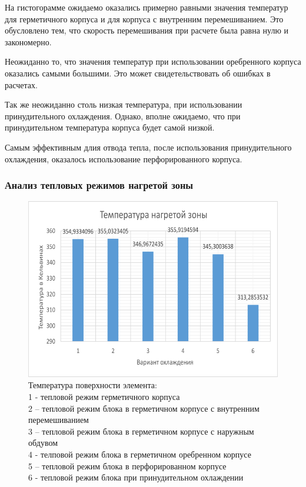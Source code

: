 На гистогорамме ожидаемо оказались примерно равными значения
температур для герметичного корпуса и для корпуса с внутренним
перемешиванием. Это обусловлено тем, что скорость перемешивания при
расчете была равна нулю и закономерно.


Неожиданно то, что значения температур при использовании
оребренного корпуса оказались самыми большими.
Это может свидетельствовать об ошибках в расчетах.

Так же неожиданно столь низкая температура,
при использовании принудительного охлаждения.
Однако, вполне ожидаемо, что при принудительном
температура корпуса будет самой низкой.

Самым эффективным длия отвода тепла, после использования
принудительного охлаждения, оказалось использование перфорированного
корпуса.

\subsubsection{Анализ тепловых режимов нагретой зоны}
\begin{figure}[h]
  \begin{center}
    \includegraphics[scale=0.4]{images2/t_surface.png}
\caption{Температура поверхности элемента:\\
  1 - тепловой режим герметичного корпуса\\
  2 – тепловой режим блока в герметичном корпусе с внутренним перемешиванием\\
  3 – тепловой режим блока в герметичном корпусе с наружным обдувом\\
  4 - телповой режим блока в  герметичном оребренном корпусе \\
  5 – тепловой режим блока в перфорированном корпусе \\
  6 - тепловой режим блока при принудительном охлаждении}
    
   \end{center}
 \end{figure}

